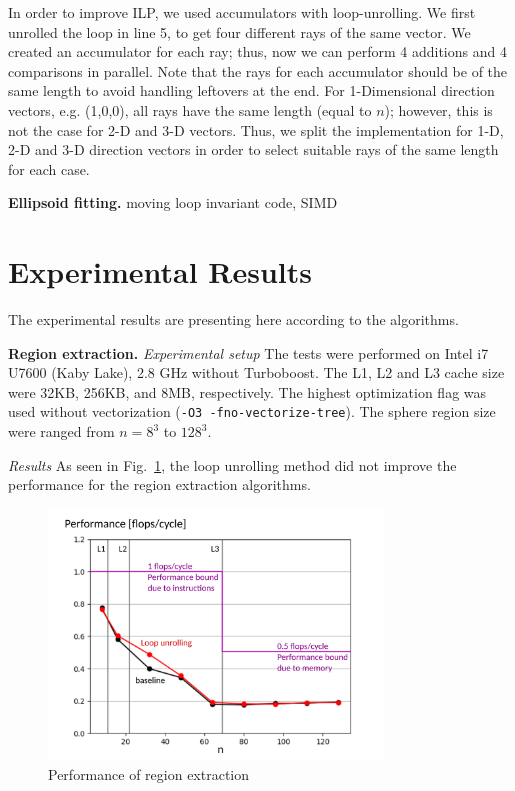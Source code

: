 \documentclass[letterpaper]{article}
\newcommand{\mypar}[1]{{\bf #1.}}
\begin{document}
In order to improve ILP, we used accumulators with loop-unrolling. We first unrolled the loop in line 5, to get four different rays of the same vector. We created an accumulator for each ray; thus, now we can perform 4 additions and 4 comparisons in parallel. Note that the rays for each accumulator should be of the same length to avoid handling leftovers at the end. For 1-Dimensional direction vectors, e.g. (1,0,0), all rays have the same length (equal to $n$); however, this is not the case for 2-D and 3-D vectors. Thus, we split the implementation for 1-D, 2-D and 3-D direction vectors in order to select suitable rays of the same length for each case.
 

\mypar{Ellipsoid fitting} moving loop invariant code, SIMD


\section{Experimental Results}\label{sec:exp}

The experimental results are presenting here according to the algorithms.

\mypar{Region extraction} \textit{Experimental setup} The tests were performed on Intel i7 U7600 (Kaby Lake), 2.8 GHz without Turboboost. The L1, L2 and L3 cache size were 32KB, 256KB, and 8MB, respectively. The highest optimization flag was used without vectorization (\texttt{-O3 -fno-vectorize-tree}). The sphere region size were ranged from $n=8^{3}$ to $128^{3}$.

\textit{Results} As seen in Fig.~\ref{res:regions}, the loop unrolling method did not improve the performance for the region extraction algorithms.
\begin{figure}[H]
  \centering
 
  \includegraphics[width=3.5in]{figs/plots/regions/regions_performance_labelled.png}
  \caption{Performance of region extraction}
  \label{res:regions}
\end{figure}
\end{document}
